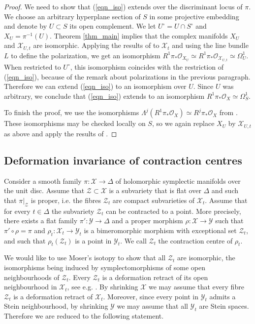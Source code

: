 \documentclass[10pt]{amsart}
\newcommand{\OO}{\mathcal{O}}
\newcommand{\XX}{\mathcal{X}}
\newcommand{\YY}{\mathcal{Y}}
\newcommand{\ZZ}{\mathcal{Z}}
\begin{document}
\begin{proof}
We need to show that (\ref{eqn_iso}) extends over the discriminant locus of $\pi$.
We choose an arbitrary hyperplane section of $S$ in some projective embedding
and denote by $U\subset S$ its open complement. We let $U^\circ = U\cap S^\circ$ and 
$X_U = \pi^{-1}(U)$. Theorem \ref{thm_main}
implies that the complex manifolds $X_U$ and $\XX_{U,t}$ are isomorphic.
Applying the results of \cite{Ma3} to $\XX_t$ and using the line bundle $L$
to define the polarization, we get an isomorphism
$R^1\pi_*\OO_{X_U} \simeq R^1\pi_*\OO_{\XX_{U,t}} \simeq \Omega^1_{U}$.
When restricted to $U^\circ$, this isomorphism coincides with the restriction of (\ref{eqn_iso}),
because of the remark about polarizations in the previous paragraph.
Therefore we can extend (\ref{eqn_iso}) to an isomorphism over $U$. Since $U$
was arbitrary, we conclude that (\ref{eqn_iso}) extends to an isomorphism 
$R^1\pi_*\OO_{X} \simeq \Omega^1_{S}$.

To finish the proof, we use the isomorphisms $\Lambda^j(R^1\pi_*\OO_X) \simeq R^j\pi_*\OO_X$
from \cite{Ma3}. These isomorphisms may be checked locally on $S$, so we again replace
$X_U$ by $\XX_{U,t}$ as above and apply the results of \cite{Ma3}.
\end{proof}

\subsection{Deformation invariance of contraction centres}\label{sec_contr}
Consider a smooth fa\-mily $\pi\colon \XX\to \Delta$
of holomorphic symplectic manifolds over the unit disc. Assume that $\ZZ\subset \XX$
is a subvariety that is flat over $\Delta$ and such that $\pi|_{\ZZ}$ is proper,
i.e. the fibres $\ZZ_t$ are compact subvarieties of $\XX_t$.
Assume that for every $t\in \Delta$ the subvariety $\ZZ_t$ can be contracted to a point.
More precisely, there exists a flat family $\pi'\colon \YY\to \Delta$
and a proper morphism $\rho\colon \XX\to \YY$ such that $\pi'\circ\rho = \pi$
and $\rho_t\colon \XX_t \to \YY_t$ is a bimeromorphic morphism with exceptional set $\ZZ_t$,
and such that $\rho_t(\ZZ_t)$ is a point in $\YY_t$. We call $\ZZ_t$ the contraction centre of $\rho_t$.

We would like to use Moser's isotopy to show that all $\ZZ_t$ are isomorphic,
the isomorphisms being induced by symplectomorphisms of some open neighbourhoods of $\ZZ_t$.
Every $\ZZ_t$ is a deformation retract of its open neighbourhood in $\XX_t$,
see e.g. \cite[Proposition 3.5]{Qu}. By shrinking $\XX$ we may assume that
every fibre $\ZZ_t$ is a deformation retract of $\XX_t$.
Moreover, since every point in $\YY_t$ admits a Stein neighbourhood, by shrinking $\YY$ we
may assume that all $\YY_t$ are Stein spaces. Therefore we are reduced to the
following statement.
\end{document}
